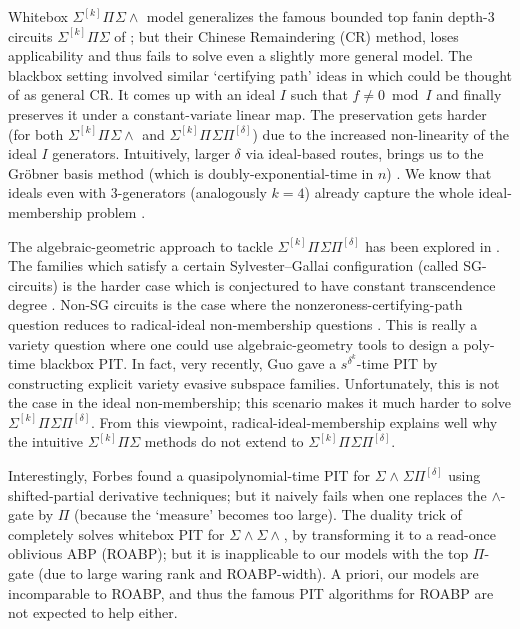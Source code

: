 \documentclass[10pt,a4paper]{article}
\newcommand{\SPSP}[3]{\Sigma^{#1}\Pi^{#2}\Sigma\Pi^{#3}}
\newcommand{\SWSP}[3]{\Sigma^{#1}\!\wedge^{#2}\!\Sigma\Pi^{#3}}
\newcommand{\SPSU}[3]{\Sigma^{#1} \Pi^{#2} \Sigma \wedge^{#3}}
\newcommand{\SWSU}[2]{\Sigma^{#1}\!\wedge\!\Sigma\!\wedge^{#2}}
\numberwithin{equation}{section}
\begin{document}
Whitebox $\SPSU{[k]}{}{}$ model generalizes the famous bounded top fanin depth-$3$ circuits $\Sigma^{[k]}\Pi\Sigma$ of  \cite{kayal2007polynomial}; but their Chinese Remaindering (CR) method, loses applicability and thus fails to solve even a slightly more general model. The blackbox setting involved similar `certifying path' ideas in \cite{saxena2012blackbox} which could be thought of as general CR. It comes up with an ideal $I$ such that $f \ne 0 \bmod I$ and finally preserves it under a constant-variate linear map. The preservation gets harder (for both $\SPSU{[k]}{}{}$ and $\SPSP{[k]}{}{[\delta]}$) due to the increased non-linearity of the ideal $I$ generators. Intuitively, larger $\delta$ via ideal-based routes, brings us to the Gr\"obner basis method (which is doubly-exponential-time in $n$) \cite{vasconcelos2004computational}. We know that ideals even with $3$-generators (analogously $k=4$) already capture the whole ideal-membership problem \cite{sap19}.

The algebraic-geometric approach to tackle $\SPSP{[k]}{}{[\delta]}$ has been explored in \cite{beecken2013algebraic,gupta2014algebraic,mukhopadhyay2016depth,zeyu2021variety}. The families which satisfy a certain Sylvester–Gallai configuration (called SG-circuits) is the harder case which is conjectured to have constant transcendence degree \cite[Conj.~1]{gupta2014algebraic}. Non-SG circuits is the case where the nonzeroness-certifying-path question reduces to radical-ideal  non-membership questions \cite{garg2020special}. This is really a variety question where one could use algebraic-geometry tools to design a poly-time blackbox PIT. In fact, very recently, Guo \cite{zeyu2021variety} gave a $s^{\delta^k}$-time PIT by constructing explicit variety evasive subspace families. Unfortunately, this is not the case in the ideal non-membership; this scenario makes it much harder to solve $\SPSP{[k]}{}{[\delta]}$. From this viewpoint, radical-ideal-membership explains well why the intuitive $\Sigma^{[k]} \Pi \Sigma$ methods do not extend to  $\SPSP{[k]}{}{[\delta]}$.

Interestingly, Forbes \cite{forbes2015deterministic} found a quasipolynomial-time PIT for $\SWSP{}{}{[\delta]}$ using shifted-partial derivative techniques; but it naively fails when one replaces the $\wedge$-gate by $\Pi$ (because the `measure' becomes too large). The duality trick of \cite{saxena2008diagonal} completely solves whitebox PIT for $\SWSU{}{}$, by transforming it to a read-once oblivious ABP (ROABP); but it is inapplicable to our models with the top $\Pi$-gate (due to large waring rank and ROABP-width). A priori, our models are incomparable to ROABP, and thus the famous PIT algorithms for ROABP \cite{forbes2013quasipolynomial,forbes2014hitting,gurjarARO} are not expected to help either.
\end{document}
